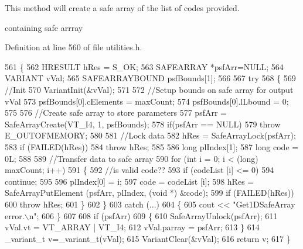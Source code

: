 This method will create a safe array of the list of codes provided.

containing safe arrray 

Definition at line 560 of file utilities.\+h.


\begin{DoxyCode}
561     \{
562         HRESULT hRes = S\_OK;
563         SAFEARRAY *psfArr=NULL;
564         VARIANT vVal;
565         SAFEARRAYBOUND psfBounds[1];
566 
567         \textcolor{keywordflow}{try}
568         \{
569             \textcolor{comment}{//Init}
570             VariantInit(&vVal);
571 
572             \textcolor{comment}{//Setup bounds on safe array for output vVal}
573             psfBounds[0].cElements = maxCount;
574             psfBounds[0].lLbound = 0;
575 
576             \textcolor{comment}{//Create safe array to store parameters}
577             psfArr = SafeArrayCreate(VT\_I4, 1, psfBounds);
578             \textcolor{keywordflow}{if}(psfArr == NULL) 
579                 \textcolor{keywordflow}{throw} E\_OUTOFMEMORY;
580 
581             \textcolor{comment}{//Lock data}
582             hRes = SafeArrayLock(psfArr);
583             \textcolor{keywordflow}{if} (FAILED(hRes)) 
584                 \textcolor{keywordflow}{throw} hRes;
585 
586             \textcolor{keywordtype}{long} plIndex[1];
587             \textcolor{keywordtype}{long} code = 0L;
588 
589             \textcolor{comment}{//Transfer data to safe array}
590             \textcolor{keywordflow}{for} (\textcolor{keywordtype}{int} i = 0; i < (long) maxCount; i++) 
591             \{
592                 \textcolor{comment}{//is valid code??}
593                 \textcolor{keywordflow}{if} (codeList [i] <= 0)
594                     \textcolor{keywordflow}{continue};
595 
596                 plIndex[0] = i;
597                 code = codeList [i];
598                 hRes = SafeArrayPutElement (psfArr, plIndex, (\textcolor{keywordtype}{void} *) &code);
599                 \textcolor{keywordflow}{if} (FAILED(hRes)) 
600                     \textcolor{keywordflow}{throw} hRes;
601             \}
602         \}
603         \textcolor{keywordflow}{catch} (...)
604         \{
605             cout << \textcolor{stringliteral}{"Get1DSafeArray error.\(\backslash\)n"};
606         \}
607 
608         \textcolor{keywordflow}{if} (psfArr) 
609         \{
610             SafeArrayUnlock(psfArr);
611             vVal.vt = VT\_ARRAY | VT\_I4;
612             vVal.parray = psfArr;
613         \}
614         \_variant\_t v=\_variant\_t(vVal);
615         VariantClear(&vVal);
616         \textcolor{keywordflow}{return} v;
617     \}
\end{DoxyCode}
\mbox{\label{class_utilities_a5e839ed4340caa91f50582656f9a9a1b_a5e839ed4340caa91f50582656f9a9a1b}} 
